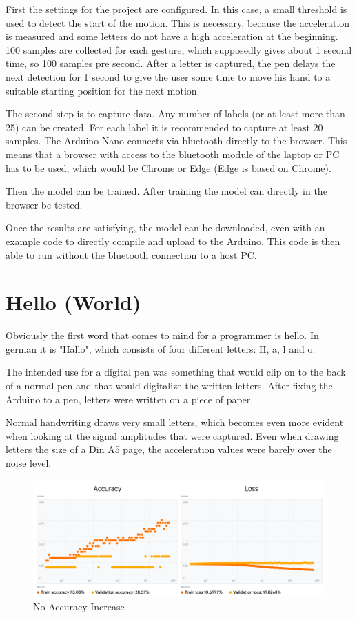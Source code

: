 \documentclass[a4paper,titlepage]{article}
\begin{document}
First the settings for the project are configured.
In this case, a small threshold is used to detect the start of the motion.
This is necessary, because the acceleration is measured and some letters do not have a high acceleration at the beginning.
100 samples are collected for each gesture, which supposedly gives about 1 second time, so 100 samples pre second.
After a letter is captured, the pen delays the next detection for 1 second to give the user some time to move his hand to a suitable starting position for the next motion.

The second step is to capture data.
Any number of labels (or at least more than 25) can be created.
For each label it is recommended to capture at least 20 samples.
The Arduino Nano connects via bluetooth directly to the browser.
This means that a browser with access to the bluetooth module of the laptop or PC has to be used, which would be Chrome or Edge (Edge is based on Chrome).

Then the model can be trained.
After training the model can directly in the browser be tested.

Once the results are satisfying, the model can be downloaded, even with an example code to directly compile and upload to the Arduino.
This code is then able to run without the bluetooth connection to a host PC.

\newpage
\section{Hello (World)}

Obviously the first word that comes to mind for a programmer is hello.
In german it is "Hallo", which consists of four different letters: H, a, l and o.

The intended use for a digital pen was something that would clip on to the back of a normal pen and that would digitalize the written letters.
After fixing the Arduino to a pen, letters were written on a piece of paper.

Normal handwriting draws very small letters, which becomes even more evident when looking at the signal amplitudes that were captured.
Even when drawing letters the size of a Din A5 page, the acceleration values were barely over the noise level.

\begin{figure}[H]
    \includegraphics[width=\textwidth]{slow_training_start.png}
    \caption{No Accuracy Increase}
\end{figure}
\end{document}

